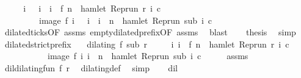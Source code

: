 \begin{isabellebody}
%
\isadelimproof
%
\endisadelimproof
%
\isatagproof
{}\isamarkupfalse%
\ {\isacharminus}\isanewline
\ \ \isamarkupfalse%
\ {\isacartoucheopen}{\isacharbraceleft}i{\isachardot}\ {}\ {\isasymle}\ i\ {\isasymand}\ i\ {\isasymle}\ f\ n\ {\isasymand}\ hamlet\ {\isacharparenleft}{\isacharparenleft}Rep{\isacharunderscore}run\ r{\isacharparenright}\ i\ c{\isacharparenright}{\isacharbraceright}\isanewline
\ \ \ \ \ \ \ \ {\isacharequal}\ image\ f\ {\isacharbraceleft}i{\isachardot}\ {}\ {\isasymle}\ i\ {\isasymand}\ i\ {\isasymle}\ n\ {\isasymand}\ hamlet\ {\isacharparenleft}{\isacharparenleft}Rep{\isacharunderscore}run\ sub{\isacharparenright}\ i\ c{\isacharparenright}{\isacharbraceright}{\isacartoucheclose}\isanewline
\ \ \ \ \isamarkupfalse%
\ dilated{\isacharunderscore}ticks{\isacharbrackleft}OF\ assms{\isacharbrackright}\ empty{\isacharunderscore}dilated{\isacharunderscore}prefix{\isacharprime}{\isacharbrackleft}OF\ assms{\isacharbrackright}\ \isamarkupfalse%
\ blast\isanewline
\ \ \isamarkupfalse%
\ {\isacharquery}thesis\ \isamarkupfalse%
\ simp\isanewline
{}\isamarkupfalse%
%
\endisatagproof
{\isafoldproof}%
%
\isadelimproof
\isanewline
%
\endisadelimproof
\isanewline
{}\isamarkupfalse%
\ dilated{\isacharunderscore}strict{\isacharunderscore}prefix{\isacharcolon}\isanewline
\ \ \ {\isacartoucheopen}dilating\ f\ sub\ r{\isacartoucheclose}\isanewline
\ \ \ \ \ {\isacartoucheopen}{\isacharbraceleft}i{\isachardot}\ i\ {\isacharless}\ f\ n\ {\isasymand}\ hamlet\ {\isacharparenleft}{\isacharparenleft}Rep{\isacharunderscore}run\ r{\isacharparenright}\ i\ c{\isacharparenright}{\isacharbraceright}\isanewline
\ \ \ \ \ \ \ \ \ \ {\isacharequal}\ image\ f\ {\isacharbraceleft}i{\isachardot}\ i\ {\isacharless}\ n\ {\isasymand}\ hamlet\ {\isacharparenleft}{\isacharparenleft}Rep{\isacharunderscore}run\ sub{\isacharparenright}\ i\ c{\isacharparenright}{\isacharbraceright}{\isacartoucheclose}\isanewline
%
\isadelimproof
%
\endisadelimproof
%
\isatagproof
{}\isamarkupfalse%
\ {\isacharminus}\isanewline
\ \ \isamarkupfalse%
\ assms\ \isamarkupfalse%
\ dil{\isacharcolon}{\isacartoucheopen}dilating{\isacharunderscore}fun\ f\ r{\isacartoucheclose}\ \isamarkupfalse%
\ dilating{\isacharunderscore}def\ \isamarkupfalse%
\ simp\isanewline
\ \ \isamarkupfalse%
\ dil\ \isamarkupfalse%

\end{isabellebody}
